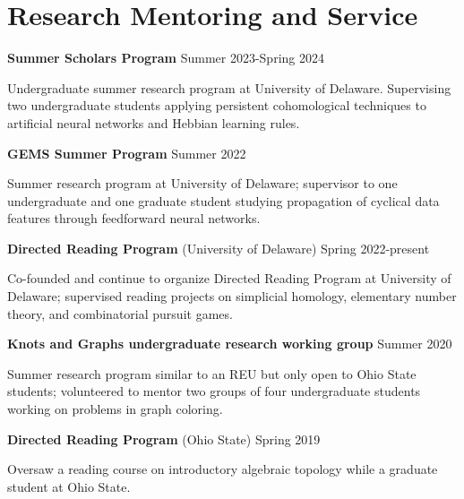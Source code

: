 \documentclass[10pt,letterpaper]{article}
\renewenvironment{itemize}{
  \begin{list}{}{
    \setlength{\leftmargin}{1.5em}
    \setlength{\itemsep}{0.25em}
    \setlength{\parskip}{0pt}
    \setlength{\parsep}{0.25em}
  }
}{
  \end{list}
}
\begin{document}
\section*{Research Mentoring and Service}
\begin{itemize}

	\item {\bf Summer Scholars Program} \hfill Summer 2023-Spring 2024
	
	\begin{itemize}
	\item Undergraduate summer research program at University of Delaware. Supervising two undergraduate students applying persistent cohomological techniques to artificial neural networks and Hebbian learning rules.
	\end{itemize}

	

	\item {\bf GEMS Summer Program} \hfill Summer 2022
	
	\begin{itemize}
	Summer research program at University of Delaware; supervisor to one undergraduate and one graduate student studying propagation of cyclical data features through feedforward neural networks.
	\end{itemize}

	\item {\bf Directed Reading Program} (University of Delaware) \hfill Spring 2022-present
	
	\begin{itemize}
	\item Co-founded and continue to organize Directed Reading Program at University of Delaware; supervised reading projects on simplicial homology, elementary number theory, and combinatorial pursuit games.
	\end{itemize}
	\item {\bf Knots and Graphs undergraduate research working group} \hfill Summer 2020
	
	\begin{itemize}
		\item Summer research program similar to an REU but only open to Ohio State students; volunteered to mentor two groups of four undergraduate students working on problems in graph coloring.
	\end{itemize}

	
	\item {\bf Directed Reading Program} (Ohio State) \hfill Spring 2019

	
	\begin{itemize}
		\item Oversaw a reading course on introductory algebraic topology while a graduate student at Ohio State.
	\end{itemize}
\end{itemize}
\end{document}
